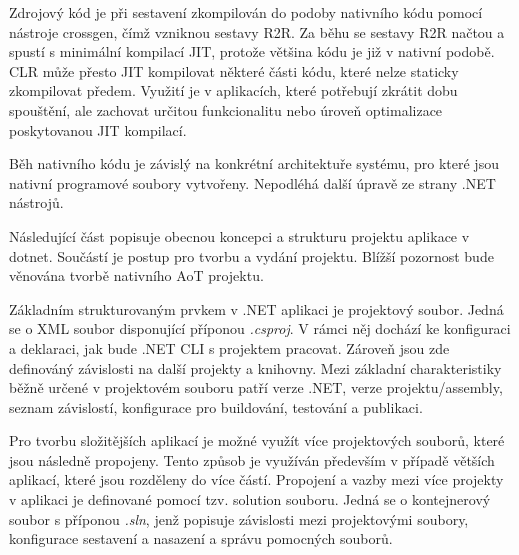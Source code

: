 
Zdrojový kód je při sestavení zkompilován do podoby nativního kódu pomocí nástroje crossgen, čímž vzniknou sestavy R2R. Za běhu se sestavy R2R načtou a spustí s minimální kompilací JIT, protože většina kódu je již v nativní podobě. CLR může přesto JIT kompilovat některé části kódu, které nelze staticky zkompilovat předem. Využití je v aplikacích, které potřebují zkrátit dobu spouštění, ale zachovat určitou funkcionalitu nebo úroveň optimalizace poskytovanou JIT kompilací.


Běh nativního kódu je závislý na konkrétní architektuře systému, pro které jsou nativní programové soubory vytvořeny. Nepodléhá další úpravě ze strany .NET nástrojů.


Následující část popisuje obecnou koncepci a strukturu projektu aplikace v dotnet. Součástí je postup pro tvorbu a vydání projektu. Blížší pozornost bude věnována tvorbě nativního AoT projektu.


Základním strukturovaným prvkem v .NET aplikaci je projektový soubor. Jedná se o XML soubor disponující příponou \emph{.csproj}. V rámci něj dochází ke konfiguraci a deklaraci, jak bude .NET CLI s projektem pracovat. Zároveň jsou zde definováný závislosti na další projekty a knihovny. Mezi základní charakteristiky běžně určené v projektovém souboru patří verze .NET, verze projektu/assembly, seznam závislostí, konfigurace pro buildování, testování a publikaci.

Pro tvorbu složitějších aplikací je možné využít více projektových souborů, které jsou následně propojeny. Tento způsob je využíván především v případě větších aplikací, které jsou rozděleny do více částí. Propojení a vazby mezi více projekty v aplikaci je definované pomocí tzv. solution souboru. Jedná se o kontejnerový soubor s příponou \emph{.sln}, jenž popisuje závislosti mezi projektovými soubory, konfigurace sestavení a nasazení a správu pomocných souborů.



